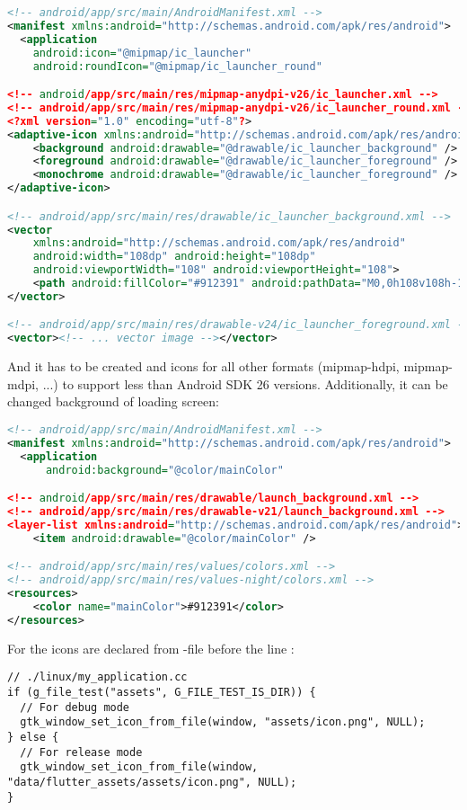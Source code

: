 \begin{lstlisting}[language=xml]
<!-- android/app/src/main/AndroidManifest.xml -->
<manifest xmlns:android="http://schemas.android.com/apk/res/android">
  <application
    android:icon="@mipmap/ic_launcher"
    android:roundIcon="@mipmap/ic_launcher_round"

<!-- android/app/src/main/res/mipmap-anydpi-v26/ic_launcher.xml -->
<!-- android/app/src/main/res/mipmap-anydpi-v26/ic_launcher_round.xml -->
<?xml version="1.0" encoding="utf-8"?>
<adaptive-icon xmlns:android="http://schemas.android.com/apk/res/android">
    <background android:drawable="@drawable/ic_launcher_background" />
    <foreground android:drawable="@drawable/ic_launcher_foreground" />
    <monochrome android:drawable="@drawable/ic_launcher_foreground" />
</adaptive-icon>

<!-- android/app/src/main/res/drawable/ic_launcher_background.xml -->
<vector
    xmlns:android="http://schemas.android.com/apk/res/android"
    android:width="108dp" android:height="108dp"
    android:viewportWidth="108" android:viewportHeight="108">
    <path android:fillColor="#912391" android:pathData="M0,0h108v108h-108z" />
</vector>

<!-- android/app/src/main/res/drawable-v24/ic_launcher_foreground.xml -->
<vector><!-- ... vector image --></vector>
\end{lstlisting}

\noindent And it has to be created  and  icons for all other formats 
(mipmap-hdpi, mipmap-mdpi, ...) to support less than Android SDK 26 versions. Additionally, it can be changed 
background of loading screen:

\begin{lstlisting}[language=xml]
<!-- android/app/src/main/AndroidManifest.xml -->
<manifest xmlns:android="http://schemas.android.com/apk/res/android">
  <application
      android:background="@color/mainColor"

<!-- android/app/src/main/res/drawable/launch_background.xml -->
<!-- android/app/src/main/res/drawable-v21/launch_background.xml -->
<layer-list xmlns:android="http://schemas.android.com/apk/res/android">
    <item android:drawable="@color/mainColor" />

<!-- android/app/src/main/res/values/colors.xml -->
<!-- android/app/src/main/res/values-night/colors.xml -->
<resources>
    <color name="mainColor">#912391</color>
</resources>
\end{lstlisting}

\noindent For  the icons are declared from -file before the line 
:

\begin{lstlisting}
// ./linux/my_application.cc
if (g_file_test("assets", G_FILE_TEST_IS_DIR)) {
  // For debug mode
  gtk_window_set_icon_from_file(window, "assets/icon.png", NULL); 
} else {
  // For release mode
  gtk_window_set_icon_from_file(window, "data/flutter_assets/assets/icon.png", NULL);
}
\end{lstlisting}
